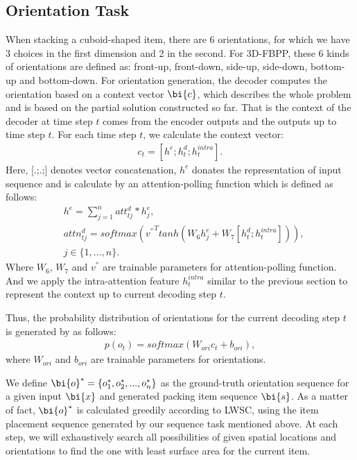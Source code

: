 \subsection{Orientation Task}
When stacking a cuboid-shaped item, there are 6 orientations, for which we have 3 choices in the first dimension and 2 in the second. For 3D-FBPP, these 6 kinds of orientations are defined as: front-up, front-down, side-up, side-down, bottom-up and bottom-down. For orientation generation, the decoder computes the orientation based on a context vector $\bi{c}$,
which describes the whole problem and is based on the partial solution constructed so far. That is the context of the decoder at time step $t$ comes from the encoder outputs and the outputs up to time step $t$. For each time step $t$, we calculate the context vector:
\begin{eqnarray*}\label{4}
 	c_t = [h^{e};h_{t}^{d};h^{intra}_{t}].
\end{eqnarray*}
Here, [.;.;] denotes vector concatenation,
$h^{e}$ donates the representation of input sequence and is calculate by an attention-polling function which is defined as follows:
\begin{eqnarray*}
	&h^{e} = \sum_{j=1}^{n}{att_{tj}^{d} * h_{j}^e}, \\
	&attn_{tj}^{d} = softmax({v^{''}}^{T}tanh(W_{6}h_{j}^{e} + W_{7}{[h_{t}^{d};h^{intra}_{t}]})), \\
	& j \in \{1,\dots,n\}.
\end{eqnarray*}
Where $W_{6}$, $W_{7}$ and $v^{''}$ are trainable parameters for attention-polling function.
And we apply the intra-attention feature $h^{intra}_{t}$ similar to the previous section to represent the context up to current decoding step $t$.

Thus, the probability distribution of orientations for the current decoding step $t$ is generated by as follows:
\begin{eqnarray*}\label{5}
	p(o_{t}) = softmax(W_{ori}c_t + b_{ori}),
\end{eqnarray*}
where $W_{ori}$ and $b_{ori}$ are trainable parameters for orientations.

We define $\bi{o}^{*} = \{o_{1}^{*},o_{2}^{*}, ..., o_{n}^{*}\}$ as the ground-truth orientation sequence for a given input $\bi{x}$ and generated packing item sequence $\bi{s}$. As a matter of fact, $\bi{o}^{*}$ is calculated greedily according to LWSC, using the item placement sequence generated by our sequence task mentioned above. At each step, we will exhaustively search all possibilities of given spatial locations and orientations to find the one with least surface area for the current item.  

